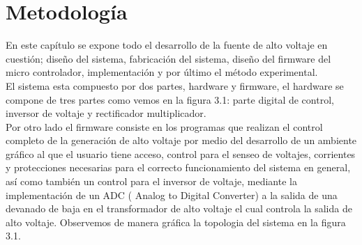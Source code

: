 

\chapter{Metodología}
En este capítulo se expone todo el desarrollo de la fuente de alto voltaje en cuestión; diseño del sistema, fabricación del sistema, diseño del firmware del micro controlador, implementación y por último el método experimental.\\

El sistema esta compuesto por dos partes, hardware y firmware, el hardware se compone de tres partes como vemos en la figura 3.1: parte digital de control, inversor de voltaje y rectificador multiplicador. \\

Por otro lado el firmware consiste en los programas que realizan el control completo de la generación de alto voltaje por medio del desarrollo de un ambiente gráfico al que el usuario tiene acceso,  control para el senseo de voltajes, corrientes y protecciones necesarias para el correcto funcionamiento del sistema en general, así como también un control para el inversor de voltaje, mediante la implementación de un ADC ( Analog to Digital Converter) a la salida de una devanado de baja en el transformador de alto voltaje el cual controla la salida de alto voltaje. Observemos de manera gráfica la topologia del sistema en la figura 3.1. 








